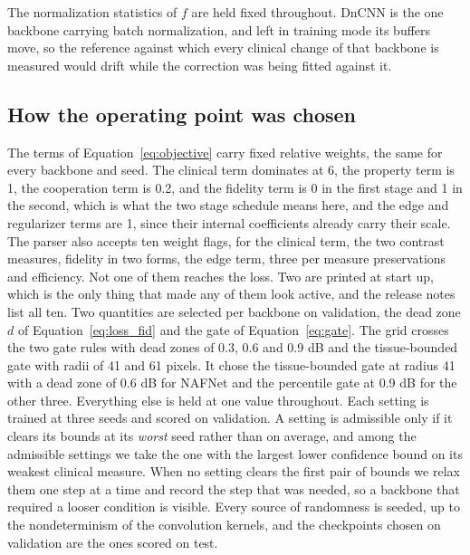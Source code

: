 The normalization statistics of $f$ are held fixed throughout. DnCNN is the one backbone carrying
batch normalization, and left in training mode its buffers move, so the reference against which every
clinical change of that backbone is measured would drift while the correction was being fitted
against it.

\subsection{How the operating point was chosen}
\label{sec:weight_selection}
The terms of Equation~\eqref{eq:objective} carry fixed relative weights, the same for every backbone
and seed. The clinical term dominates at 6, the property term is 1, the cooperation term is 0.2, and
the fidelity term is 0 in the first stage and 1 in the second, which is what the two stage schedule
means here, and the edge and regularizer terms are 1, since their internal coefficients
already carry their scale. The parser also accepts ten weight flags, for the clinical
term, the two contrast measures, fidelity in two forms, the edge term, three per measure
preservations and efficiency. Not one of them reaches the loss. Two are printed at start up, which is
the only thing that made any of them look active, and the release notes list all ten. Two quantities
are selected per backbone on validation, the dead zone $d$ of Equation~\eqref{eq:loss_fid} and the
gate of Equation~\eqref{eq:gate}. The grid crosses the two gate rules with dead zones of 0.3, 0.6 and
0.9 dB and the tissue-bounded gate with radii of 41 and 61 pixels. It chose the tissue-bounded gate
at radius 41 with a dead zone of 0.6 dB for NAFNet and the percentile gate at 0.9 dB for the other
three. Everything else is held at one value throughout. Each setting is trained at three seeds and
scored on validation. A setting is admissible only if it clears its bounds at its
\emph{worst} seed rather than on average, and among the
admissible settings we take the one with the largest lower confidence bound on its weakest clinical
measure. When no setting clears the first pair of bounds we relax them one step at a time and record the step
that was needed, so a backbone that required a looser condition is visible. Every source of
randomness is seeded, up to the nondeterminism of the convolution kernels, and the checkpoints chosen
on validation are the ones scored on test.

